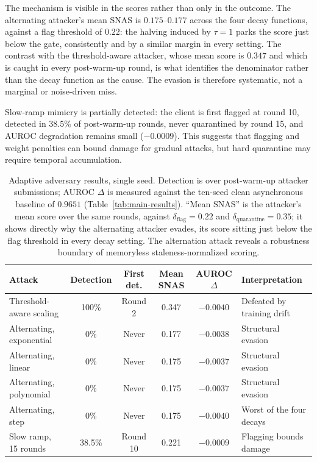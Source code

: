 \documentclass[pdflatex,sn-mathphys-num]{sn-jnl}
\begin{document}
The mechanism is visible in the scores rather than only in the outcome. The alternating attacker's mean SNAS is $0.175$--$0.177$ across the four decay functions, against a flag threshold of $0.22$: the halving induced by $\tau=1$ parks the score just below the gate, consistently and by a similar margin in every setting. The contrast with the threshold-aware attacker, whose mean score is $0.347$ and which is caught in every post-warm-up round, is what identifies the denominator rather than the decay function as the cause. The evasion is therefore systematic, not a marginal or noise-driven miss.

Slow-ramp mimicry is partially detected: the client is first flagged at round 10, detected in $38.5\%$ of post-warm-up rounds, never quarantined by round 15, and AUROC degradation remains small ($-0.0009$). This suggests that flagging and weight penalties can bound damage for gradual attacks, but hard quarantine may require temporal accumulation.

\begin{table}[htbp]
\caption{Adaptive adversary results, single seed. Detection is over post-warm-up attacker submissions; AUROC $\Delta$ is measured against the ten-seed clean asynchronous baseline of $0.9651$ (Table~\ref{tab:main-results}). ``Mean SNAS'' is the attacker's mean score over the same rounds, against $\delta_{\mathrm{flag}}=0.22$ and $\delta_{\mathrm{quarantine}}=0.35$; it shows directly why the alternating attacker evades, its score sitting just below the flag threshold in every decay setting. The alternation attack reveals a robustness boundary of memoryless staleness-normalized scoring.}
\label{tab:adaptive}
\centering
\begin{tabularx}{\textwidth}{@{}>{\raggedright\arraybackslash}p{3.2cm}cccc>{\raggedright\arraybackslash}X@{}}
\toprule
Attack & Detection & First det. & Mean SNAS & AUROC $\Delta$ & Interpretation \\
\midrule
Threshold-aware scaling & 100\% & Round 2 & 0.347 & $-0.0040$ & Defeated by training drift \\
Alternating, exponential & 0\% & Never & 0.177 & $-0.0038$ & Structural evasion \\
Alternating, linear & 0\% & Never & 0.175 & $-0.0037$ & Structural evasion \\
Alternating, polynomial & 0\% & Never & 0.175 & $-0.0037$ & Structural evasion \\
Alternating, step & 0\% & Never & 0.175 & $-0.0040$ & Worst of the four decays \\
Slow ramp, 15 rounds & 38.5\% & Round 10 & 0.221 & $-0.0009$ & Flagging bounds damage \\
\bottomrule
\end{tabularx}
\end{table}
\end{document}
